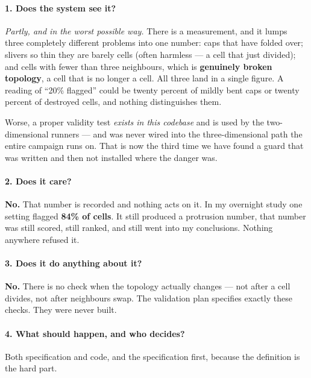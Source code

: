 \documentclass[11pt,a4paper]{article}
\begin{document}
\paragraph{1. Does the system see it?} \emph{Partly, and in the worst possible way.} There is a
measurement, and it lumps three completely different problems into one number: caps that have
folded over; slivers so thin they are barely cells (often harmless --- a cell that just divided);
and cells with fewer than three neighbours, which is \textbf{genuinely broken topology}, a cell
that is no longer a cell. All three land in a single figure. A reading of ``20\% flagged'' could
be twenty percent of mildly bent caps or twenty percent of destroyed cells, and nothing
distinguishes them.

Worse, a proper validity test \emph{exists in this codebase} and is used by the two-dimensional
runners --- and was never wired into the three-dimensional path the entire campaign runs on. That
is now the third time we have found a guard that was written and then not installed where the
danger was.

\paragraph{2. Does it care?} \textbf{No.} That number is recorded and nothing acts on it. In my
overnight study one setting flagged \textbf{84\% of cells}. It still produced a protrusion number,
that number was still scored, still ranked, and still went into my conclusions. Nothing anywhere
refused it.

\paragraph{3. Does it do anything about it?} \textbf{No.} There is no check when the topology
actually changes --- not after a cell divides, not after neighbours swap. The validation plan
specifies exactly these checks. They were never built.

\paragraph{4. What should happen, and who decides?} Both specification and code, and the
specification first, because the definition is the hard part.
\end{document}
